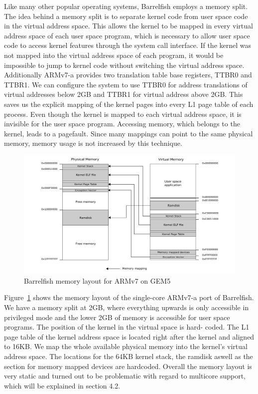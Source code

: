 \documentclass[a4paper,twoside]{report} %
\begin{document}
Like many other popular operating systems, Barrelfish employs a memory
split. The idea behind a memory split is to separate kernel code from
user space code in the virtual address space. This allows the kernel
to be mapped in every virtual address space of each user space
program, which is necessary to allow user space code to access kernel
features through the system call interface. If the kernel was not
mapped into the virtual address space of each program, it would be
impossible to jump to kernel code without switching the virtual
address space. Additionally ARMv7-a provides two translation table
base registers, TTBR0 and TTBR1. We can configure the system to use
TTBR0 for address translations of virtual addresses below 2GB and
TTBR1 for virtual address above 2GB. This saves us the explicit
mapping of the kernel pages into every L1 page table of each process.
Even though the kernel is mapped to each virtual address space, it is
invisible for the user space program. Accessing memory, which belongs
to the kernel, leads to a pagefault. Since many mappings can point to
the same physical memory, memory usage is not increased by this
technique.

\begin{figure}[htb]
  \centering
  \includegraphics[width=\linewidth]{figures/memory_layout.png}
  \caption{Barrelfish memory layout for ARMv7 on GEM5}
  \label{fig:memory_layout}
\end{figure}

Figure~\ref{fig:memory_layout} shows the memory layout of the
single-core ARMv7-a port of Barrelfish. We have a memory split at 2GB,
where everything upwards is only accessible in privileged mode and the
lower 2GB of memory is accessible for user space programs. The
position of the kernel in the virtual space is hard- coded. The L1
page table of the kernel address space is located right after the
kernel and aligned to 16KB. We map the whole available physical memory
into the kernel’s virtual address space. The locations for the 64KB
kernel stack, the ramdisk aswell as the section for memory mapped
devices are hardcoded.  Overall the memory layout is very static and
turned out to be problematic with regard to multicore support, which
will be explained in section 4.2.
\end{document}
